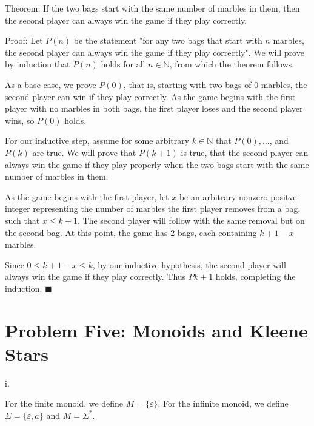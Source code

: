 \documentclass{article}
\renewcommand{\(}{\left(}
\renewcommand{\)}{\right)}
\renewcommand\qedsymbol{$\blacksquare$}
\theoremstyle{plain}
\theoremstyle{plain}
\theoremstyle{definition}
\begin{document}
    \begin{shaded}
        Theorem: If the two bags start with the same number of marbles in them, then the second player can always win the game if they play correctly.

        \vspace*{4mm}

        Proof: Let $P(n)$ be the statement "for any two bags that start with $n$ marbles, the second player can always win the game if they play correctly". We will prove by induction that $P(n)$ holds for all $n\in\mathbb{N}$, from which the theorem follows.

        \vspace*{4mm}

        As a base case, we prove $P(0)$, that is, starting with two bags of 0 marbles, the second player can win if they play correctly. As the game begins with the first player with no marbles in both bags, the first player loses and the second player wins, so $P(0)$ holds.

        \vspace*{4mm}

        For our inductive step, assume for some arbitrary $k\in\mathbb{N}$ that $P(0),\dots$, and $P(k)$ are true. We will prove that $P(k+1)$ is true, that the second player can always win the game if they play properly when the two bags start with the same number of marbles in them.

        \vspace*{4mm}

        As the game begins with the first player, let $x$ be an arbitrary nonzero positve integer representing the number of marbles the first player removes from a bag, such that $x\leq k+1$. The second player will follow with the same removal but on the second bag. At this point, the game has 2 bags, each containing $k+1-x$ marbles.

        \vspace*{4mm}

        Since $0\leq k+1-x\leq k$, by our inductive hypothesis, the second player will always win the game if they play correctly. Thus $P{k+1}$ holds, completing the induction. \qedsymbol
    \end{shaded}
    
\newpage

\section*{Problem Five: Monoids and Kleene Stars}
    i.
    \begin{shaded}
        For the finite monoid, we define $M=\{\varepsilon\}$.
        For the infinite monoid, we define $\Sigma=\{\varepsilon, a\}$ and $M=\Sigma^{*}$.
    \end{shaded}
    
\end{document}
